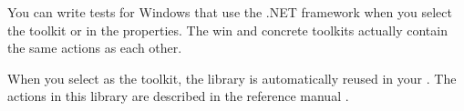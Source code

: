 You can write tests for Windows \gdauts{} that use the .NET framework when you select the toolkit  or  in the \gdproject{} properties. The win and concrete toolkits actually contain the same actions as each other. 

When you select  as the \gdproject{} toolkit, the library \gdproject{}  is automatically reused in your \gdproject{}. The actions in this library are described in the reference manual .
